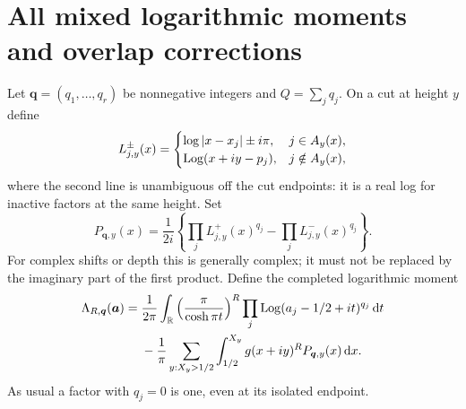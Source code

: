 \documentclass[11pt,letterpaper]{article}
\theoremstyle{definition}\newtheorem{definition}[theorem]{Definition}
\theoremstyle{remark}\newtheorem{remark}[theorem]{Remark}
\newcommand{\dd}{\,\mathrm d}\newcommand{\M}{\mathcal M}
\begin{document}
\section{All mixed logarithmic moments and overlap corrections}
\label{mr:sec:logs}
Let $\boldsymbol q=(q_1,\ldots,q_r)$ be nonnegative integers and
$Q=\sum_jq_j$. On a cut at height $y$ define
\begin{equation}\label{mr:eq:Lpm}
 L_{j,y}^{\pm}(x)=
 \begin{cases}
 \log|x-x_j|\pm i\pi,&j\in A_y(x),\\
 \operatorname{Log}(x+iy-p_j),&j\notin A_y(x),
 \end{cases}
\end{equation}
where the second line is unambiguous off the cut endpoints: it is a
real log for inactive factors at the same height. Set
\begin{equation}\label{mr:eq:jumpP}
 P_{\boldsymbol q,y}(x)=\frac1{2i}
 \left\{\prod_jL_{j,y}^+(x)^{q_j}
       -\prod_jL_{j,y}^-(x)^{q_j}\right\}.
\end{equation}
For complex shifts or depth this is generally complex; it must not be
replaced by the imaginary part of the first product.
Define the completed logarithmic moment
\begin{align}
 \Lambda_{R,\boldsymbol q}(\boldsymbol a)
 ={}&\frac1{2\pi}\int_\R
 \left(\frac\pi{\cosh\pi t}\right)^R
 \prod_j\Log(a_j-1/2+it)^{q_j}\dd t\nonumber\\
 &-\frac1\pi\sum_{y:X_y>1/2}\int_{1/2}^{X_y}
       g(x+iy)^R P_{\boldsymbol q,y}(x)\dd x.
 \label{mr:eq:Lambda}
\end{align}
As usual a factor with $q_j=0$ is one, even at its isolated endpoint.
\end{document}
